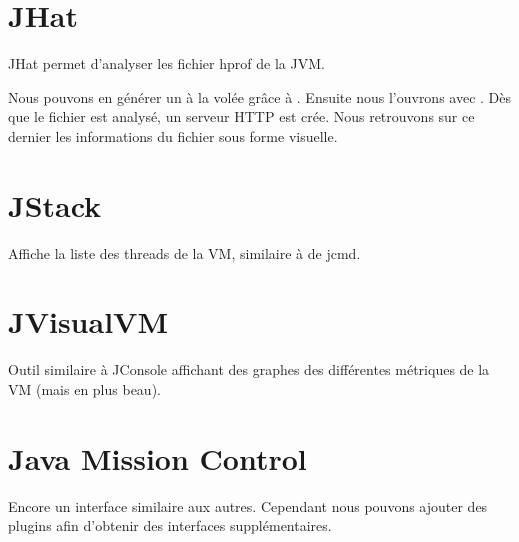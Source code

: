 \documentclass{report}
\begin{document}
		\section{JHat}
			JHat permet d'analyser les fichier hprof de la JVM.
			
			Nous pouvons en générer un à la volée grâce à .
			Ensuite nous l'ouvrons avec .
			Dès que le fichier est analysé, un serveur HTTP est crée.
			Nous retrouvons sur ce dernier les informations du fichier sous forme visuelle.
			
			
		\section{JStack}
			Affiche la liste des threads de la VM, similaire à  de jcmd.
			
		\section{JVisualVM}
			Outil similaire à JConsole affichant des graphes des différentes métriques de la VM (mais en plus beau).
			
		\section{Java Mission Control}
			Encore un interface similaire aux autres.
			Cependant nous pouvons ajouter des plugins afin d'obtenir des interfaces supplémentaires.
			
\end{document}

